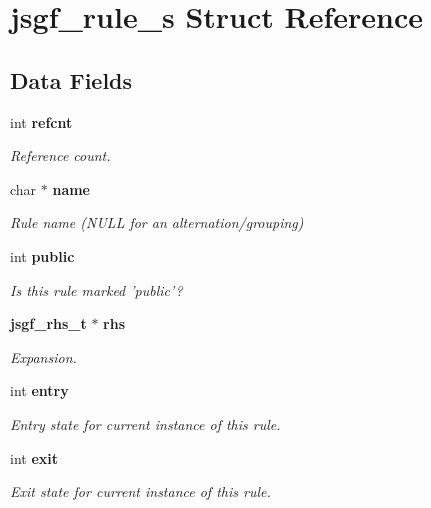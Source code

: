 \section{jsgf\-\_\-rule\-\_\-s Struct Reference}
\label{structjsgf__rule__s}
\subsection*{Data Fields}
\begin{DoxyCompactItemize}
\item 
int {\bf refcnt}
\begin{DoxyCompactList}\small\item\em Reference count. \end{DoxyCompactList}\item 
char $\ast$ {\bf name}\label{structjsgf__rule__s_a1b1de5afa4c0f27df4e8d51ebc47ca92}

\begin{DoxyCompactList}\small\item\em Rule name (N\-U\-L\-L for an alternation/grouping) \end{DoxyCompactList}\item 
int {\bf public}\label{structjsgf__rule__s_acf6dcb033906d79f3c10d411aad4e318}

\begin{DoxyCompactList}\small\item\em Is this rule marked 'public'? \end{DoxyCompactList}\item 
{\bf jsgf\-\_\-rhs\-\_\-t} $\ast$ {\bf rhs}\label{structjsgf__rule__s_a6923b74ad72f8b663cc00dfa99490981}

\begin{DoxyCompactList}\small\item\em Expansion. \end{DoxyCompactList}\item 
int {\bf entry}
\begin{DoxyCompactList}\small\item\em Entry state for current instance of this rule. \end{DoxyCompactList}\item 
int {\bf exit}
\begin{DoxyCompactList}\small\item\em Exit state for current instance of this rule. \end{DoxyCompactList}\end{DoxyCompactItemize}


